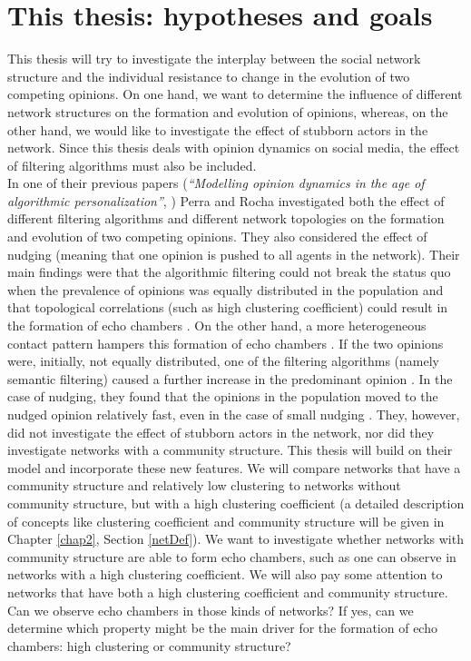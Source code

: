 \documentclass[11 pt , letterpaper , twoside , openright]{book}
\begin{document}

\section{This thesis: hypotheses and goals}\label{goal}

This thesis will try to investigate the interplay between the social network structure and the individual resistance to change in the evolution of two competing opinions. On one hand, we want to determine the influence of different network structures on the formation and evolution of opinions, whereas, on the other hand, we would like to investigate the effect of stubborn actors in the network. Since this thesis deals with opinion dynamics on social media, the effect of filtering algorithms must also be included.\\ 
\newline
In one of their previous papers (\textit{``Modelling opinion dynamics in the age of algorithmic personalization''}, \cite{Perra2019}) Perra and Rocha investigated both the effect of different filtering algorithms and different network topologies on the formation and evolution of two competing opinions. They also considered the effect of nudging (meaning that one opinion is pushed to all agents in the network). Their main findings were that the algorithmic filtering could not break the status quo when the prevalence of opinions was equally distributed in the population and that topological correlations (such as high clustering coefficient) could result in the formation of echo chambers \cite{Perra2019}. On the other hand, a more heterogeneous contact pattern hampers this formation of echo chambers \cite{Perra2019}. If the two opinions were, initially, not equally distributed, one of the filtering algorithms (namely semantic filtering) caused a further increase in the predominant opinion \cite{Perra2019}. In the case of nudging, they found that the opinions in the population moved to the nudged opinion relatively fast, even in the case of small nudging \cite{Perra2019}. They, however, did not investigate the effect of stubborn actors in the network, nor did they investigate networks with a community structure. This thesis will build on their model and incorporate these new features. We will compare networks that have a community structure and relatively low clustering to networks without community structure, but with a high clustering coefficient (a detailed description of concepts like clustering coefficient and community structure will be given in Chapter \ref{chap2}, Section \ref{netDef}). We want to investigate whether networks with community structure are able to form echo chambers, such as one can observe in networks with a high clustering coefficient. We will also pay some attention to networks that have both a high clustering coefficient and community structure. Can we observe echo chambers in those kinds of networks? If yes, can we determine which property might be the main driver for the formation of echo chambers: high clustering or community structure? \\
\end{document}
